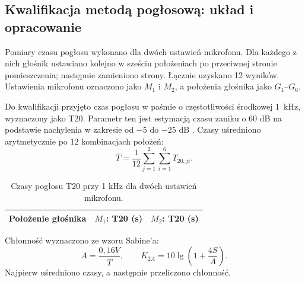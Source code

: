 \subsection{Kwalifikacja metodą pogłosową: układ i opracowanie}
Pomiary czasu pogłosu wykonano dla dwóch ustawień mikrofonu.
Dla każdego z nich głośnik ustawiano kolejno w sześciu położeniach
po przeciwnej stronie pomieszczenia; następnie zamieniono strony.
Łącznie uzyskano 12 wyników. Ustawienia mikrofonu oznaczono jako
$M_1$ i $M_2$, a położenia głośnika jako $G_1$--$G_6$.


Do kwalifikacji przyjęto czas pogłosu w paśmie o częstotliwości
środkowej \qty{1}{\kilo\hertz}, wyznaczony jako T20.
Parametr ten jest estymacją czasu zaniku o 60 dB na podstawie
nachylenia w zakresie od $-5$ do $-25$ dB \autocite{bkReverb}.
Czasy uśredniono arytmetycznie po 12 kombinacjach położeń:
\begin{equation}
\overline T=\frac{1}{12}\sum_{j=1}^{2}\sum_{i=1}^{6}T_{20,ji}.
\end{equation}
\begin{table}[H]
\centering
\caption{Czasy pogłosu T20 przy 1 kHz dla dwóch ustawień mikrofonu.}
\begin{tabular}{@{}c r r@{}}
\toprule
Położenie głośnika & $M_1$: T20 (s) & $M_2$: T20 (s)\\
\midrule

\end{tabular}
\end{table}

Chłonność wyznaczono ze wzoru Sabine'a:
\begin{equation}
A=\frac{0{,}16V}{\overline T},\qquad
K_{2A}=10\lg\left(1+\frac{4S}{A}\right).
\end{equation}
Najpierw uśredniono czasy, a następnie przeliczono chłonność.

